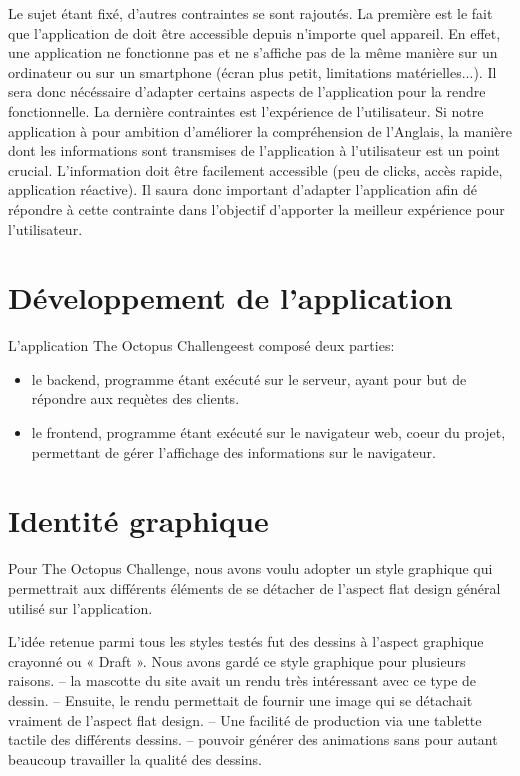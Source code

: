 \documentclass[a4paper,11pt, oneside]{book}
\def\appName{The Octopus Challenge}
\begin{document}
Le sujet étant fixé, d'autres contraintes se sont rajoutés. La première est le fait que l'application de doit être accessible depuis n'importe quel appareil. En effet,
une application ne fonctionne pas et ne s'affiche pas de la même manière sur un ordinateur ou sur un smartphone (écran plus petit, limitations matérielles...). Il sera donc nécéssaire
d'adapter certains aspects de l'application pour la rendre fonctionnelle. La dernière contraintes est l'expérience de l'utilisateur. Si notre application à pour ambition d'améliorer
la compréhension de l'Anglais, la manière dont les informations sont transmises de l'application à l'utilisateur est un point crucial. L'information doit être facilement accessible (peu de clicks, accès rapide, application réactive).
Il saura donc important d'adapter l'application afin dé répondre à cette contrainte dans l'objectif d'apporter la meilleur expérience pour l'utilisateur.


\clearpage
\section{Développement de l'application}


L'application \appName est composé deux parties:
\begin{itemize}
	\item le backend, programme étant exécuté sur le serveur, ayant pour but de répondre aux requètes des clients.
	\item le frontend, programme étant exécuté sur le navigateur web, coeur du projet, permettant de gérer l'affichage des informations sur le navigateur.
\end{itemize}

\section{Identité graphique}
Pour \appName, nous avons voulu adopter un style graphique qui permettrait aux différents éléments de se détacher de l’aspect flat design général utilisé sur l’application.

L’idée retenue parmi tous les styles testés fut des dessins à l’aspect graphique crayonné ou « Draft ».
Nous avons gardé ce style graphique pour plusieurs raisons.
– la mascotte du site avait un rendu très intéressant avec ce type de dessin.
– Ensuite, le rendu permettait de fournir une image qui se détachait vraiment de l’aspect flat design.
– Une facilité de production via une tablette tactile des différents dessins.
– pouvoir générer des animations sans pour autant beaucoup travailler la qualité des dessins.
\end{document}
